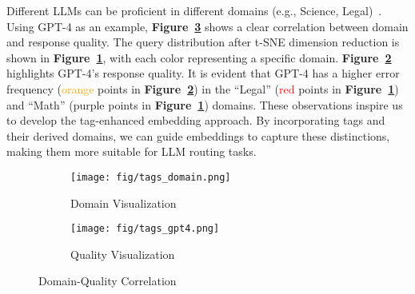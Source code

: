 Different LLMs can be proficient in different domains (e.g., Science, Legal)~\cite{liu-etal-2024-mathbench}.
Using GPT-4 as an example, \textbf{Figure~\ref{fig:tags_embedding}} shows a clear correlation between domain and response quality. The query distribution after t-SNE dimension reduction is shown in \textbf{Figure~\ref{fig:tags_a}}, with each color representing a specific domain. \textbf{Figure~\ref{fig:tags_b}} highlights GPT-4's response quality.
It is evident that GPT-4 has a higher error frequency (\textcolor{orange}{orange} points in \textbf{Figure~\ref{fig:tags_b}}) in the ``Legal'' (\textcolor{red}{red} points in \textbf{Figure~\ref{fig:tags_a}}) and ``Math'' (\textcolor{myPurple}{purple} points in \textbf{Figure~\ref{fig:tags_a}}) domains. 
These observations inspire us to develop the tag-enhanced embedding approach. By incorporating tags and their derived domains, we can guide embeddings to capture these distinctions, making them more suitable for LLM routing tasks.




\begin{figure}[htbp]
\centering
\begin{subfigure}{0.49\linewidth}
\centering
\texttt{[image: fig/tags\_domain.png]}
\caption{Domain Visualization}
\label{fig:tags_a}
\end{subfigure}
\hfill
\begin{subfigure}{0.49\linewidth}
\centering
\texttt{[image: fig/tags\_gpt4.png]}
\caption{Quality Visualization}
\label{fig:tags_b}
\end{subfigure}

\caption{Domain-Quality Correlation}
\label{fig:tags_embedding}
\end{figure}

